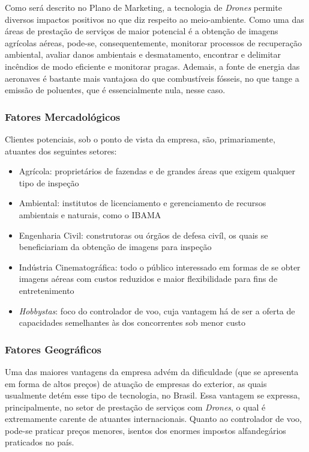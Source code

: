 Como será descrito no Plano de Marketing, a tecnologia de \emph{Drones} permite diversos impactos positivos 
no que diz respeito ao meio-ambiente. Como uma das áreas de prestação de serviços de maior potencial 
é a obtenção de imagens agrícolas aéreas, pode-se, consequentemente, monitorar processos de recuperação 
ambiental, avaliar danos ambientais e desmatamento, encontrar e delimitar incêndios de modo eficiente e 
monitorar pragas. Ademais, a fonte de energia das aeronaves é bastante mais vantajosa do que combustíveis 
fósseis, no que tange a emissão de poluentes, que é essencialmente nula, nesse caso.

\subsubsection*{Fatores Mercadológicos}

Clientes potenciais, sob o ponto de vista da empresa, são, primariamente, atuantes dos seguintes setores:

\begin{itemize}
	\item Agrícola: proprietários de fazendas e de grandes áreas que exigem qualquer tipo de inspeção
	\item Ambiental: institutos de licenciamento e gerenciamento de recursos ambientais e naturais, como o IBAMA
	\item Engenharia Civil: construtoras ou órgãos de defesa civíl, os quais se beneficiariam da obtenção de 
	imagens para inspeção
	\item Indústria Cinematográfica: todo o público interessado em formas de se obter imagens aéreas com custos reduzidos e 
	maior flexibilidade para fins de entretenimento
	\item \emph{Hobbystas}: foco do controlador de voo, cuja vantagem há de ser a oferta de capacidades semelhantes às dos 
	concorrentes sob menor custo
\end{itemize}

\subsubsection*{Fatores Geográficos}

Uma das maiores vantagens da empresa advém da dificuldade (que se apresenta em forma de altos preços) 
de atuação de empresas do exterior, as quais usualmente detém esse tipo de tecnologia, no Brasil. Essa 
vantagem se expressa, principalmente, no setor de prestação de serviços com \emph{Drones}, o qual é extremamente 
carente de atuantes internacionais. Quanto ao controlador de voo, pode-se praticar preços menores, isentos 
dos enormes impostos alfandegários praticados no país.

